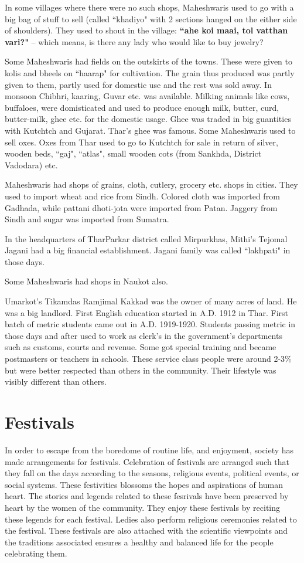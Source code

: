 In some villages where there were no such shops, Maheshwaris used to go with a
big bag of stuff to sell (called ``khadiyo" with 2 sections hanged on the either
side of shoulders). They used to shout in the village: \textbf{``ahe koi maai,
tol vatthan vari?"} -- which means, is there any lady who would like to buy
jewelry?

Some Maheshwaris had fields on the outskirts of the towns. These were given to
kolis and bheels on ``haarap" for cultivation. The grain thus produced was
partly given to them, partly used for domestic use and the rest was sold away.
In monsoon Chibhri, kaaring, Guvar etc. was available. Milking animals like
cows, buffaloes, were domisticated and used to produce enough milk, butter,
curd, butter-milk, ghee etc. for the domestic usage. Ghee was traded in big
guantities with Kutchtch and Gujarat. Thar's ghee was famous. Some Maheshwaris
used to sell oxes. Oxes from Thar used to go to Kutchtch for sale in return of
silver, wooden beds, ``gaj", ``atlas", small wooden cots (from Sankhda, District
Vadodara) etc.

Maheshwaris had shops of grains, cloth, cutlery, grocery etc. shops in cities.
They used to import wheat and rice from Sindh. Colored cloth was imported from
Gadhada, while pattani dhoti-jota were imported from Patan. Jaggery from Sindh
and sugar was imported from Sumatra.

In the headquarters of TharParkar district called Mirpurkhas, Mithi's Tejomal
Jagani had a big financial establishment. Jagani family was called ``lakhpati"
in those days.

Some Maheshwaris had shops in Naukot also.

Umarkot's Tikamdas Ramjimal Kakkad was the owner of many acres of land. He was a
big landlord. First English education started in A.D. 1912 in Thar. First batch
of metric students came out in A.D. 1919-1920. Students passing metric  in those
days and after used to work as clerk's in the government's departments such as
customs, courts and revenue. Some got special training and became postmasters or
teachers in schools. These service class people were around 2-3\% but were
better respected than others in the community. Their lifestyle was visibly
different than others.
\section{Festivals}
In order to escape from the boredome of routine life, and enjoyment,  society has made
arrangements for festivals. Celebration of festivals are arranged such that they
fall on the days according to the seasons, religious events, political events,
or social systems. These festivities blossoms the hopes and aspirations of human
heart. The stories and legends related to these fesrivals have been preserved by
heart by the women of the community. They enjoy these festivals by reciting
these legends for each festival. Ledies also perform religious ceremonies
related to the festival. These festivals are also attached with the scientific
viewpoints and the traditions associated ensures a healthy and balanced life for
the people celebrating them. 


